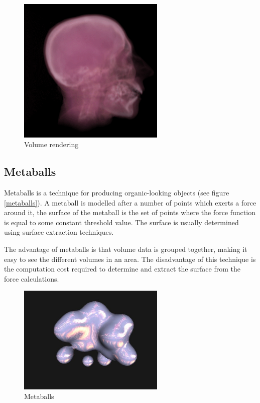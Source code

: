 \begin{figure}[h!]
  \begin{center}
    \includegraphics[width=70mm]{head_volume}
  \end{center}
  \caption{Volume rendering}
  \label{fig:headvolume}
\end{figure}


\subsection{Metaballs}
\label{sub:metaballs}


Metaballs is a technique for producing organic-looking objects (see figure
\ref{metaballs}). A metaball is modelled after a number of points which exerts
a force around it, the surface of the metaball is the set of points where the
force function is equal to some constant threshold value. The surface is
usually determined using surface extraction techniques.

The advantage of metaballs is that volume data is grouped together, making it
easy to see the different volumes in an area. The disadvantage of this
technique is the computation cost required to determine and extract the surface
from the force calculations.

\begin{figure}[h!]
  \begin{center}
    \includegraphics[width=70mm]{metaballs}
  \end{center}
  \caption{Metaballs}
  \label{fig:metaballs}
\end{figure}

